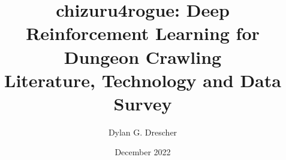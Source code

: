 \documentclass[11pt,a4paper]{article}
\begin{document}
\title{chizuru4rogue: Deep Reinforcement Learning for Dungeon Crawling \\[1ex] \large Literature, Technology and Data Survey}
\author{Dylan G. Drescher}
\date{December 2022}
\maketitle
\end{document}
